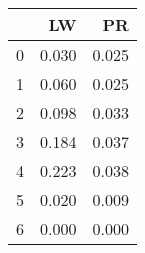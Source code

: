 \begin{tabular}{lrr}
\toprule
{} &     LW &     PR \\
\midrule
0 &  0.030 &  0.025 \\
1 &  0.060 &  0.025 \\
2 &  0.098 &  0.033 \\
3 &  0.184 &  0.037 \\
4 &  0.223 &  0.038 \\
5 &  0.020 &  0.009 \\
6 &  0.000 &  0.000 \\
\bottomrule
\end{tabular}
